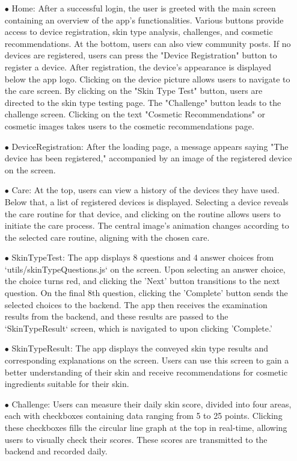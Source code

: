 \documentclass[conference]{IEEEtran}
\begin{document}
\begin{itemize}
\begin{itemize}
    \item[$\bullet$] Home: After a successful login, the user is greeted with the main screen containing an overview of the app's functionalities. Various buttons provide access to device registration, skin type analysis, challenges, and cosmetic recommendations. At the bottom, users can also view community posts. If no devices are registered, users can press the "Device Registration" button to register a device. After registration, the device's appearance is displayed below the app logo. Clicking on the device picture allows users to navigate to the care screen. By clicking on the "Skin Type Test" button, users are directed to the skin type testing page. The "Challenge" button leads to the challenge screen. Clicking on the text "Cosmetic Recommendations" or cosmetic images takes users to the cosmetic recommendations page.
    \item[$\bullet$] DeviceRegistration: After the loading page, a message appears saying "The device has been registered," accompanied by an image of the registered device on the screen.
    \item[$\bullet$] Care: At the top, users can view a history of the devices they have used. Below that, a list of registered devices is displayed. Selecting a device reveals the care routine for that device, and clicking on the routine allows users to initiate the care process. The central image's animation changes according to the selected care routine, aligning with the chosen care.
    \item[$\bullet$] SkinTypeTest: The app displays 8 questions and 4 answer choices from `utils/skinTypeQuestions.js` on the screen. Upon selecting an answer choice, the choice turns red, and clicking the 'Next' button transitions to the next question. On the final 8th question, clicking the 'Complete' button sends the selected choices to the backend. The app then receives the examination results from the backend, and these results are passed to the `SkinTypeResult` screen, which is navigated to upon clicking 'Complete.'
    \item[$\bullet$] SkinTypeResult: The app displays the conveyed skin type results and corresponding explanations on the screen. Users can use this screen to gain a better understanding of their skin and receive recommendations for cosmetic ingredients suitable for their skin.
    \item[$\bullet$] Challenge: Users can measure their daily skin score, divided into four areas, each with checkboxes containing data ranging from 5 to 25 points. Clicking these checkboxes fills the circular line graph at the top in real-time, allowing users to visually check their scores. These scores are transmitted to the backend and recorded daily.

\end{itemize}
\end{itemize}
\end{document}
